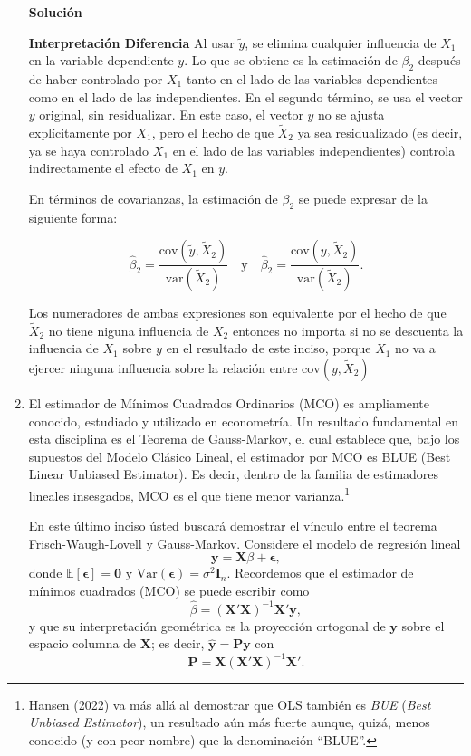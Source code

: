 \documentclass[a4paper, answers, addpoints, 11pt]{exam}
\newenvironment{solucion}{%
  \begin{mdframed}[
    backgroundcolor=blue!5,    %
    linecolor=blue!50,          %
    linewidth=2pt,              %
    leftmargin=10pt,            %
    rightmargin=8pt,           %
    topline=true,              %
    bottomline=true,            %
    roundcorner=10pt,           %
    innerleftmargin=10pt,       %
    innerrightmargin=10pt,      %
    innerbottommargin=10pt,     %
    innertopmargin=10pt         %
  ]%
  \begin{tcolorbox}[colframe=blue!50!black, colback=blue!50, coltitle=white, sharp corners=all, boxrule=1mm, width=\textwidth, halign=left, valign=center, top=0mm, bottom=0mm, left=0mm, right=0mm] \textbf{Solución} \end{tcolorbox} }{\end{mdframed}}
\begin{document}
\begin{enumerate}
\begin{solucion}
\textbf{Interpretación Diferencia}
Al usar \( \tilde{y} \), se elimina cualquier influencia de \( X_1 \) en la variable dependiente \( y \). Lo que se obtiene es la estimación de \( \beta_2 \) después de haber controlado por \( X_1 \) tanto en el lado de las variables dependientes como en el lado de las independientes. En el segundo término, se usa el vector \( y \) original, sin residualizar. En este caso, el vector \( y \) no se ajusta explícitamente por \( X_1 \), pero el hecho de que \( \tilde{X}_2 \) ya sea residualizado (es decir, ya se haya controlado \( X_1 \) en el lado de las variables independientes) controla indirectamente el efecto de \( X_1 \) en \( y \).

En términos de covarianzas, la estimación de \( \beta_2 \) se puede expresar de la siguiente forma:

\[
\hat{\beta}_2 = \frac{\text{cov}(\tilde{y}, \tilde{X}_2)}{\text{var}(\tilde{X}_2)} \quad \text{y} \quad \hat{\beta}_2 = \frac{\text{cov}(y, \tilde{X}_2)}{\text{var}(\tilde{X}_2)}.
\]

Los numeradores de ambas expresiones son equivalente por el hecho de que \( \tilde{X}_2 \) no tiene niguna influencia de \( X_2 \) entonces no importa si no se descuenta la influencia de \( X_1 \) sobre \( y \) en el resultado de este inciso, porque \( X_1 \) no va a ejercer ninguna influencia sobre la relación entre 
$\text{cov}(y, \tilde{X}_2)$


\end{solucion}

    \item El estimador de Mínimos Cuadrados Ordinarios (MCO) es ampliamente conocido, estudiado y utilizado en econometría. Un resultado fundamental en esta disciplina es el Teorema de Gauss-Markov, el cual establece que, bajo los supuestos del Modelo Clásico Lineal, el estimador por MCO es BLUE (Best Linear Unbiased Estimator). Es decir, dentro de la familia de estimadores lineales insesgados, MCO es el que tiene menor varianza.\footnote{Hansen (2022) va más allá al demostrar que OLS también es \textit{BUE} (\textit{Best Unbiased Estimator}), un resultado aún más fuerte aunque, quizá, menos conocido (y con peor nombre) que la denominación ``BLUE''.}  
    
    En este último inciso ústed buscará demostrar el vínculo entre el teorema Frisch-Waugh-Lovell y Gauss-Markov. Considere el modelo de regresión lineal
\begin{equation}\label{EQ:modeloGM}
    \mathbf{y} = \mathbf{X}\beta + \boldsymbol\epsilon,
\end{equation}
donde \(\mathbb{E}[\boldsymbol\epsilon] = \mathbf{0}\) y \(\mathrm{Var}(\boldsymbol\epsilon)=\sigma^2 \mathbf{I}_n\). Recordemos que el estimador de mínimos cuadrados (MCO) se puede escribir como
\[
\hat{\beta} = (\mathbf{X}'\mathbf{X})^{-1}\mathbf{X}'\mathbf{y},
\]
y que su interpretación geométrica es la proyección ortogonal de \(\mathbf{y}\) sobre el espacio columna de \(\mathbf{X}\); es decir, \(\hat{\mathbf{y}} = \mathbf{P}\mathbf{y}\) con
\[
\mathbf{P} = \mathbf{X}(\mathbf{X}'\mathbf{X})^{-1}\mathbf{X}'.
\]


\end{enumerate}
\end{document}
